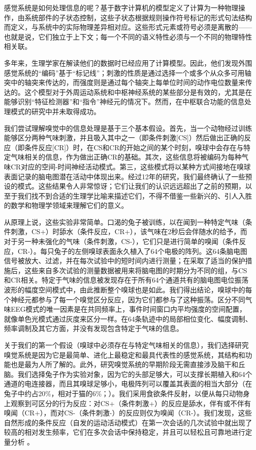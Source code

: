 \documentclass[a4paper,12pt]{article}
\begin{document}
感觉系统是如何处理信息的呢？基于数字计算机的模型定义了计算为一种物理操作，由系统部件的子状态控制，这些子状态根据规则操作符号标记的形式句法结构而定义，与系统中的实际物理差异相对应。这些形式元素或符号必须是离散的——也就是说，它们独立于上下文；每一个不同的语义特性必须与一个不同的物理特性相关联\cite[p.~50,74]{pylyshyn1984}。

多年来，生理学家在解读他们的数据时已经应用了计算模型。因此，他们发现外围感觉系统的“编码”基于“标记线”\cite[p.~274]{bullock1965}；刺激的性质是通过选择一个或多个从众多可用轴突中的轴突来传达的，而强度则是通过每个轴突上每单位时间的动作电位数量来传达的。这个模型对于外周运动系统和中枢神经系统的某些部分是有效的，尤其是在能够识别“特征检测器”和“指令”神经元的情况下。然而，在中枢联合功能的信息处理模式的研究中并未取得成功\cite{barlow1972}\cite{perkel1968}。

我们尝试理解嗅觉中的信息处理是基于三个基本假设。首先，当一个动物经过训练能够区分两种气味刺激，并且吸入其中之一（即条件刺激[CS]）然后做出正确的反应（即条件反应[CR]）时，在CS和CR的开始之间的某个时刻，嗅球中会存在与特定气味相关的信息，作为做出正确CR的基础。其次，这些信息将被编码为每种气味CR对应的空间-时间神经活动模式。第三，这些模式将以某种方式间接地在嗅球表面记录的脑电图潜在活动中体现出来。经过12年的研究，我们最终确认了一些预设的模式\cite{freeman1986a}。这些结果令人非常惊讶；它们让我们的认识远远超出了之前的预期，以至于我们找不到合适的生理学比喻来描述它们，不得不借鉴一些新兴的、引人入胜的数学和物理学领域来理解它们的意义。

从原理上说，这些实验非常简单。口渴的兔子被训练\cite{prisco1985}，以在闻到一种特定气味（条件刺激，CS+）时舔水（条件反应，CR+），该气味在2秒后会伴随水的给予，而对于另一种未强化的气味（条件刺激，CS-），它们只是进行简单的嗅闻（条件反应，CR-）。每只兔子的左侧嗅球表面永久植入了64个电极的阵列。这64条脑电图信号被放大、过滤，并在每次试验中的短时间内进行测量；在采取了适当的保护措施\cite{freeman1987b}后，这些来自多次试验的测量数据被用来将脑电图的时期分为不同的组，与CS和CR相关。特定于气味的信息被发现存在于所有64个通道共有的脑电图电位振荡波形的幅度空间模式中，由此推断整个嗅球也是如此。我们得出结论，嗅球中的每个神经元都参与了每一个嗅觉区分反应，因为它们都参与了这种振荡。区分不同气味EEG模式的唯一因素是在共同频率上，事件时间窗口内平均强度的空间配置，就像单色光模式通过灰度来区分一样。在64条轨迹中的局部相位变化、幅度调制、频率调制及其它方面，并没有发现包含特定于气味的信息。

关于我们的第一个假设（嗅球中必须存在与特定气味相关的信息），我们选择研究嗅觉系统是因为它是最简单、进化上最稳定和最具代表性的感觉系统，其结构和功能也是最为人所了解的。此外，研究嗅觉系统的早期阶段无需直接涉及脑干和丘脑。我们选择兔子作为实验对象，因为它的头部足够大，可以支撑长期植入和64个通道的电连接器，而且其嗅球足够小，电极阵列可以覆盖其表面的相当大部分（在兔子中约占20\%，相对于猫的6\%；\cite{freeman1978}）。我们采用食欲条件反射，以便从每只动物身上观察到可区分的行为反应：对CS+（条件刺激+）的反应是舔水，伴有或不伴有嗅闻（CR+），而对CS-（条件刺激-）的反应则仅为嗅闻（CR-）。我们发现，这些自然形成的条件反应（自发的运动活动模式）在第一次会话的几次试验中就出现了较高的相对发生频率，它们在多次会话中保持稳定，并且可以轻松且可靠地进行定量分析\cite{freeman1981} \cite{freeman1986b}。
\end{document}
